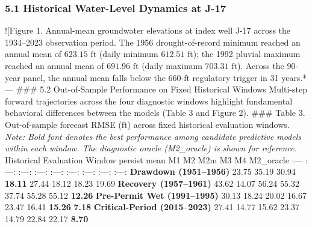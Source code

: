 \documentclass[11pt]{article}
\begin{document}
\subsubsection{5.1 Historical Water-Level Dynamics at
J-17}\label{historical-water-level-dynamics-at-j-17}

!{[}Figure 1. Annual-mean groundwater elevations at index well J-17
across the 1934--2023 observation period. The 1956 drought-of-record
minimum reached an annual mean of \(623.15\text{ ft}\) (daily minimum
\(612.51\text{ ft}\)); the 1992 pluvial maximum reached an annual mean
of \(691.96\text{ ft}\) (daily maximum \(703.31\text{ ft}\)). Across the
90-year panel, the annual mean falls below the 660-ft regulatory trigger
in 31 years.* --- \#\#\# 5.2 Out-of-Sample Performance on Fixed
Historical Windows Multi-step forward trajectories across the four
diagnostic windows highlight fundamental behavioral differences between
the models (Table 3 and Figure 2). \#\#\# Table 3. Out-of-sample
forecast RMSE (ft) across fixed historical evaluation windows.
\emph{Note: Bold font denotes the best performance among candidate
predictive models within each window. The diagnostic oracle (M2\_oracle)
is shown for reference.} \textbar{} Historical Evaluation Window
\textbar{} persist \textbar{} mean \textbar{} M1 \textbar{} M2
\textbar{} M2m \textbar{} M3 \textbar{} M4 \textbar{} M2\_oracle
\textbar{} \textbar{} :--- \textbar{} :---: \textbar{} :---: \textbar{}
:---: \textbar{} :---: \textbar{} :---: \textbar{} :---: \textbar{}
:---: \textbar{} :---: \textbar{} \textbar{} \textbf{Drawdown
(1951--1956)} \textbar{} 23.75 \textbar{} 35.19 \textbar{} 30.94
\textbar{} \textbf{18.11} \textbar{} 27.44 \textbar{} 18.12 \textbar{}
18.23 \textbar{} 19.69 \textbar{} \textbar{} \textbf{Recovery
(1957--1961)} \textbar{} 43.62 \textbar{} 14.07 \textbar{} 56.24
\textbar{} 55.32 \textbar{} 37.74 \textbar{} 55.28 \textbar{} 55.12
\textbar{} \textbf{12.26} \textbar{} \textbar{} \textbf{Pre-Permit Wet
(1991--1995)} \textbar{} 30.13 \textbar{} 18.24 \textbar{} 20.02
\textbar{} 16.67 \textbar{} 23.47 \textbar{} 16.41 \textbar{}
\textbf{15.26} \textbar{} \textbf{7.18} \textbar{} \textbar{}
\textbf{Critical-Period (2015--2023)} \textbar{} 27.41 \textbar{} 14.77
\textbar{} 15.62 \textbar{} 23.37 \textbar{} 14.79 \textbar{} 22.84
\textbar{} 22.17 \textbar{} \textbf{8.70} \textbar{}
\end{document}
